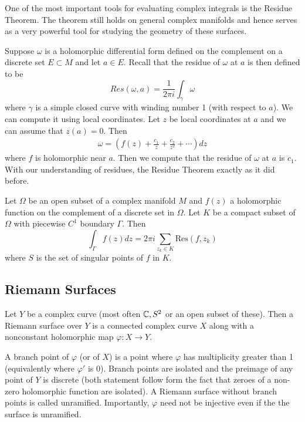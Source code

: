 \secbreak

One of the most important tools for evaluating complex integrals is the Residue Theorem. The theorem still holds on general complex manifolds and hence serves as a very powerful tool for studying the geometry of these surfaces. 

Suppose $\omega$ is a holomorphic differential form defined on the complement on a discrete set $E \subset M$ and let $a \in E$. Recall that the residue of $\omega$ at $a$ is then defined to be
$$Res(\omega, a) = \frac{1}{2\pi i} \int_\gamma \omega$$
where $\gamma$ is a simple closed curve with winding number 1 (with respect to $a$). We can compute it using local coordinates. Let $z$ be local coordinates at $a$ and we can assume that $z(a) = 0$. Then 
\begin{align*}
    \omega = \left( f(z) + \frac{c_1}{z} + \frac{c_2}{z^2} + \cdots \right) dz
\end{align*}
where $f$ is holomorphic near $a$. Then we compute that the residue of $\omega$ at $a$ is $c_1$. With our understanding of residues, the Residue Theorem exactly as it did before.
\begin{theorem}
    Let $\Omega$ be an open subset of a complex manifold $M$ and $f(z)$ a holomorphic function on the complement of a discrete set in $\Omega$. Let $K$ be a compact subset of $\Omega$ with piecewise $C^1$ boundary $\Gamma$. Then
    $$\int_{\Gamma} f(z) dz = 2\pi i \sum_{z_k \in K} \text{Res}(f, z_k)$$
    where $S$ is the set of singular points of $f$ in $K$. 
\end{theorem}

\subsection{Riemann Surfaces}
Let $Y$ be a complex curve (most often $\mathbb{C}, S^2$ or an open subset of these). Then a Riemann surface over $Y$ is a connected complex curve $X$ along with a nonconstant holomorphic map $\varphi: X \to Y$. 

A branch point of $\varphi$ (or of $X$) is a point where $\varphi$ has multiplicity greater than 1 (equivalently where $\varphi'$ is 0). Branch points are isolated and the preimage of any point of $Y$ is discrete (both statement follow form the fact that zeroes of a non-zero holomorphic function are isolated). A Riemann surface without branch points is called unramified. Importantly, $\varphi$ need not be injective even if the the surface is unramified. 

